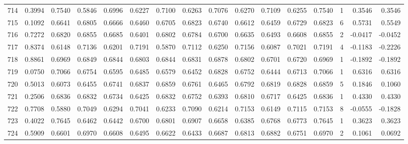 \begin{tabular}{lrrrrrrrrrrrrrrr}
714 &      0.3994 &  0.7540 &  0.5846 &  0.6996 &  0.6227 &  0.7100 &  0.6263 &  0.7076 &  0.6270 &  0.7109 &   0.6255 &     0.7540 &      1 &                    0.3546 &                     0.3546 \\
715 &      0.1092 &  0.6641 &  0.6805 &  0.6666 &  0.6460 &  0.6705 &  0.6823 &  0.6740 &  0.6612 &  0.6459 &   0.6729 &     0.6823 &      6 &                    0.5731 &                     0.5549 \\
716 &      0.7272 &  0.6820 &  0.6855 &  0.6685 &  0.6401 &  0.6802 &  0.6784 &  0.6700 &  0.6635 &  0.6493 &   0.6608 &     0.6855 &      2 &                   -0.0417 &                    -0.0452 \\
717 &      0.8374 &  0.6148 &  0.7136 &  0.6201 &  0.7191 &  0.5870 &  0.7112 &  0.6250 &  0.7156 &  0.6087 &   0.7021 &     0.7191 &      4 &                   -0.1183 &                    -0.2226 \\
718 &      0.8861 &  0.6969 &  0.6849 &  0.6844 &  0.6803 &  0.6844 &  0.6831 &  0.6878 &  0.6802 &  0.6701 &   0.6720 &     0.6969 &      1 &                   -0.1892 &                    -0.1892 \\
719 &      0.0750 &  0.7066 &  0.6754 &  0.6595 &  0.6485 &  0.6579 &  0.6452 &  0.6828 &  0.6752 &  0.6444 &   0.6713 &     0.7066 &      1 &                    0.6316 &                     0.6316 \\
720 &      0.5013 &  0.6073 &  0.6455 &  0.6741 &  0.6837 &  0.6859 &  0.6761 &  0.6465 &  0.6792 &  0.6819 &   0.6828 &     0.6859 &      5 &                    0.1846 &                     0.1060 \\
721 &      0.2506 &  0.6836 &  0.6832 &  0.6734 &  0.6425 &  0.6832 &  0.6752 &  0.6393 &  0.6810 &  0.6717 &   0.6425 &     0.6836 &      1 &                    0.4330 &                     0.4330 \\
722 &      0.7708 &  0.5880 &  0.7049 &  0.6294 &  0.7041 &  0.6233 &  0.7090 &  0.6214 &  0.7153 &  0.6149 &   0.7115 &     0.7153 &      8 &                   -0.0555 &                    -0.1828 \\
723 &      0.4022 &  0.7645 &  0.6462 &  0.6442 &  0.6700 &  0.6801 &  0.6907 &  0.6658 &  0.6385 &  0.6768 &   0.6773 &     0.7645 &      1 &                    0.3623 &                     0.3623 \\
724 &      0.5909 &  0.6601 &  0.6970 &  0.6608 &  0.6495 &  0.6622 &  0.6433 &  0.6687 &  0.6813 &  0.6882 &   0.6751 &     0.6970 &      2 &                    0.1061 &                     0.0692 \\

\end{tabular}
